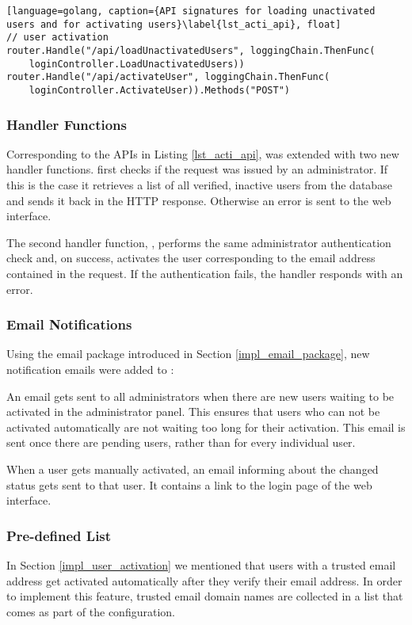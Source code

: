 \begin{lstlisting}[language=golang, caption={API signatures for loading unactivated users and for activating users}\label{lst_acti_api}, float]
// user activation
router.Handle("/api/loadUnactivatedUsers", loggingChain.ThenFunc(
	loginController.LoadUnactivatedUsers))
router.Handle("/api/activateUser", loggingChain.ThenFunc(
	loginController.ActivateUser)).Methods("POST")
\end{lstlisting}

\subsubsection{Handler Functions}
Corresponding to the APIs in Listing \ref{lst_acti_api}, \lcs was extended with two new handler functions.  first checks if the request was issued by an administrator. If this is the case it retrieves a list of all verified, inactive users from the database and sends it back in the HTTP response. Otherwise an error is sent to the web interface.

The second handler function, , performs the same administrator authentication check and, on success, activates the user corresponding to the email address contained in the request. If the authentication fails, the handler responds with an error.

\subsubsection{Email Notifications}
Using the email package introduced in Section \ref{impl_email_package}, new notification emails were added to \lcs:

An email gets sent to all administrators when there are new users waiting to be activated in the administrator panel. This ensures that users who can not be activated automatically are not waiting too long for their activation. This email is sent once there are pending users, rather than for every individual user.

When a user gets manually activated, an email informing about the changed status gets sent to that user. It contains a link to the login page of the web interface.

\subsubsection{Pre-defined List}
In Section \ref{impl_user_activation} we mentioned that users with a trusted email address get activated automatically after they verify their email address. In order to implement this feature, trusted email domain names are collected in a list that comes as part of the \lcs configuration.

